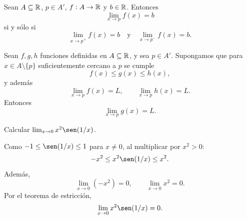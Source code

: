 \begin{teorema}
Sean $A\subseteq\mathbb{R}$, $p\in A'$, $f:A\to\mathbb{R}$ y $b\in\mathbb{R}$.
Entonces
\[
\lim_{x\to p}f(x)=b
\]
si y sólo si
\[
\lim_{x\to p^+}f(x)=b \quad\text{y}\quad \lim_{x\to p^-}f(x)=b.
\]
\end{teorema}

\begin{teorema}
Sean $f,g,h$ funciones definidas en $A\subseteq\mathbb{R}$, y sea $p\in A'$.
Supongamos que para $x\in A\setminus\{p\}$ suficientemente cercano a $p$ se cumple
\[
f(x)\le g(x)\le h(x),
\]
y además
\[
\lim_{x\to p}f(x)=L,
\qquad
\lim_{x\to p}h(x)=L.
\]
Entonces
\[
\lim_{x\to p}g(x)=L.
\]
\end{teorema}

\begin{example}
Calcular $\lim_{x\to 0}x^2\sen(1/x)$.

Como $-1\le\sen(1/x)\le 1$ para $x\neq 0$, al multiplicar por $x^2>0$:
\[
-x^2\le x^2\sen(1/x)\le x^2.
\]
Además,
\[
\lim_{x\to 0}(-x^2)=0,
\qquad
\lim_{x\to 0}x^2=0.
\]
Por el teorema de estricción,
\[
\lim_{x\to 0}x^2\sen(1/x)=0.
\]
\end{example}
